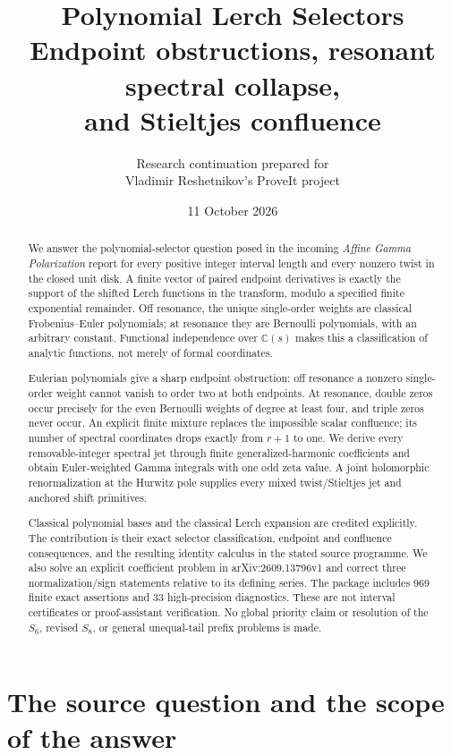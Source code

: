 \documentclass[11pt,letterpaper]{article}
\title{\textbf{Polynomial Lerch Selectors}\\[7pt]
\large Endpoint obstructions, resonant spectral collapse,\\
and Stieltjes confluence}
\author{Research continuation prepared for\\Vladimir Reshetnikov's ProveIt project}
\date{11 October 2026}
\numberwithin{equation}{section}
\theoremstyle{definition}
\theoremstyle{remark}\newtheorem{remark}[theorem]{Remark}
\newcommand{\C}{\mathbb C}\newcommand{\Q}{\mathbb Q}
\begin{document}
\maketitle
\begin{abstract}
We answer the polynomial-selector question posed in the incoming
\emph{Affine Gamma Polarization} report for every positive integer
interval length and every nonzero twist in the closed unit disk.
A finite vector of paired endpoint derivatives is exactly the support
of the shifted Lerch functions in the transform, modulo a specified
finite exponential remainder. Off resonance, the unique single-order
weights are classical Frobenius--Euler polynomials; at resonance they
are Bernoulli polynomials, with an arbitrary constant. Functional
independence over $\C(s)$ makes this a classification of analytic
functions, not merely of formal coordinates.

Eulerian polynomials give a sharp endpoint obstruction: off resonance
a nonzero single-order weight cannot vanish to order two at both
endpoints. At resonance, double zeros occur precisely for the even
Bernoulli weights of degree at least four, and triple zeros never occur.
An explicit finite mixture replaces the impossible scalar confluence;
its number of spectral coordinates drops exactly from $r+1$ to one.
We derive every removable-integer spectral jet through finite
generalized-harmonic coefficients and obtain Euler-weighted Gamma
integrals with one odd zeta value. A joint holomorphic renormalization
at the Hurwitz pole supplies every mixed twist/Stieltjes jet and
anchored shift primitives.

Classical polynomial bases and the classical Lerch expansion are
credited explicitly. The contribution is their exact selector
classification, endpoint and confluence consequences, and the resulting
identity calculus in the stated source programme. We also solve an
explicit coefficient problem in arXiv:2609.13796v1 and correct three
normalization/sign statements relative to its defining series. The package includes
969 finite exact assertions and 33 high-precision diagnostics. These
are not interval certificates or proof-assistant verification. No global
priority claim or resolution of the $S_6$, revised $S_8$, or general
unequal-tail prefix problems is made.
\end{abstract}
\newpage
\tableofcontents
\newpage

\section{The source question and the scope of the answer}
\label{pls:sec:scope}
\end{document}
